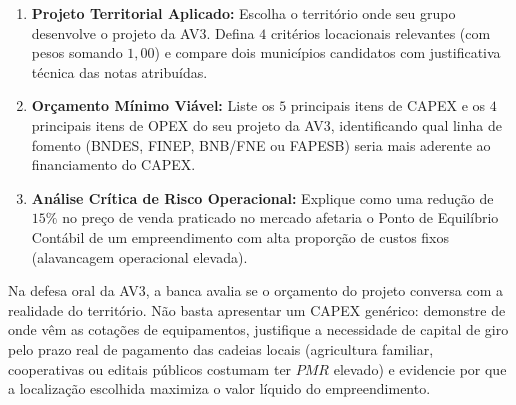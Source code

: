 \begin{enumerate}[leftmargin=1.6em, itemsep=5pt]
  \item \textbf{Projeto Territorial Aplicado:} Escolha o território onde seu grupo desenvolve o projeto da AV3. Defina $4$ critérios locacionais relevantes (com pesos somando $1{,}00$) e compare dois municípios candidatos com justificativa técnica das notas atribuídas. \espacoResolucao[1.8cm]
  \item \textbf{Orçamento Mínimo Viável:} Liste os $5$ principais itens de CAPEX e os $4$ principais itens de OPEX do seu projeto da AV3, identificando qual linha de fomento (BNDES, FINEP, BNB/FNE ou FAPESB) seria mais aderente ao financiamento do CAPEX. \espacoResolucao[1.8cm]
  \item \textbf{Análise Crítica de Risco Operacional:} Explique como uma redução de $15\%$ no preço de venda praticado no mercado afetaria o Ponto de Equilíbrio Contábil de um empreendimento com alta proporção de custos fixos (alavancagem operacional elevada). \espacoResolucao[1.6cm]
\end{enumerate}

\begin{boxDica}
Na defesa oral da AV3, a banca avalia se o orçamento do projeto conversa com a realidade do território. Não basta apresentar um CAPEX genérico: demonstre de onde vêm as cotações de equipamentos, justifique a necessidade de capital de giro pelo prazo real de pagamento das cadeias locais (agricultura familiar, cooperativas ou editais públicos costumam ter $PMR$ elevado) e evidencie por que a localização escolhida maximiza o valor líquido do empreendimento.
\end{boxDica}

\clearpage
{}

